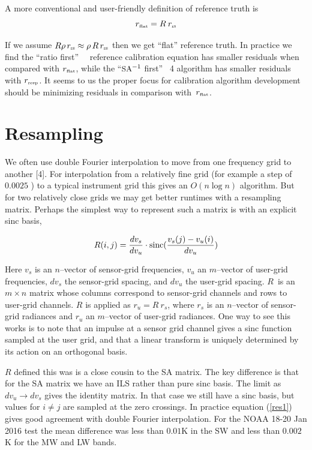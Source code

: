 \documentclass[12pt]{article}
\begin{document}
\vspace{2mm}
A more conventional and user-friendly definition of reference truth
is
\begin{equation}
  r_{\mbox{\tiny flat}} =  R \: r_{\mbox{\tiny\textsc{es}}}
\end{equation} 

\noindent
If we assume $R\rho\,r_{\mbox{\tiny\textsc{es}}} \approx \rho\,R\,r_{\mbox{\tiny\textsc{es}}}$ then we get
``flat'' reference truth.  In practice we find the ``ratio first''
\umbc\ \ccast\ reference calibration equation has smaller residuals
when compared with $r_{\mbox{\tiny flat}}$, while the ``$\mbox{\small SA}^{-1}$ first'' \noaa~4
algorithm has smaller residuals with $r_{\mbox{\tiny resp}}$.  It seems to us the
proper focus for calibration algorithm development should be
minimizing residuals in comparison with~$r_{\mbox{\tiny flat}}$.

\newpage
\section{Resampling}

We often use double Fourier interpolation to move from one frequency
grid to another [4].  For interpolation from a relatively fine grid
(for example a step of $0.0025$ \wn) to a typical instrument grid
this gives an $O(n \log n)$ algorithm.  But for two relatively close
grids we may get better runtimes with a resampling matrix.  Perhaps
the simplest way to represent such a matrix is with an explicit sinc
basis,

\begin{equation}\label{res1}
  R(i,j) = \frac{dv_s}{dv_u}\cdot
      \mbox{sinc}(\displaystyle \frac{v_s(j) - v_u(i)}{dv_u})
\end{equation} 

\noindent
Here $v_s$ is an $n$--vector of sensor-grid frequencies, $v_u$ an
$m$--vector of user-grid frequencies, $dv_s$ the sensor-grid
spacing, and $dv_u$ the user-grid spacing.  $R$~is an $m \times n$
matrix whose columns correspond to sensor-grid channels and rows to
user-grid channels.  $R$ is applied as $r_u = R \: r_s$, where $r_s$
is an $n$--vector of sensor-grid radiances and $r_u$ an $m$--vector
of user-grid radiances.  One way to see this works is to note that
an impulse at a sensor grid channel gives a sinc function sampled at
the user grid, and that a linear transform is uniquely determined by
its action on an orthogonal basis.  

$R$ defined this was is a close cousin to the {\cris} SA matrix.
The key difference is that for the SA matrix we have an ILS rather
than pure sinc basis.  The limit as $dv_u \rightarrow dv_s$ gives
the identity matrix.  In that case we still have a sinc basis, but
values for $i\ne j$ are sampled at the zero crossings.
In practice equation (\ref{res1}) gives good agreement with double
Fourier interpolation.  For the NOAA 18-20 Jan 2016 test the mean
difference was less than $0.01$K in the SW and less than $0.002$K
for the MW and LW {\cris} bands.
\end{document}
